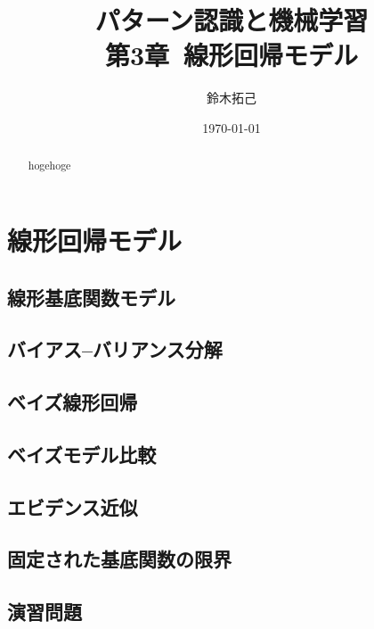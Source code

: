 \documentclass[uplatex,a4paper,oneside,openany,dvipdfmx]{jsarticle}
\title{パターン認識と機械学習\\第3章\ 線形回帰モデル}
\author{鈴木拓己}
\date{\today}
\numberwithin{equation}{section}
\theoremstyle{mystyle} %
\begin{document}
\maketitle
\setcounter{tocdepth}{3}

\tableofcontents

\begin{abstract}
    hogehoge
\end{abstract}

\setcounter{section}{2}
\section{線形回帰モデル}

\subsection{線形基底関数モデル}

\subsection{バイアス--バリアンス分解}

\subsection{ベイズ線形回帰}

\subsection{ベイズモデル比較}

\subsection{エビデンス近似}

\subsection{固定された基底関数の限界}

\subsection{演習問題}
\end{document}

